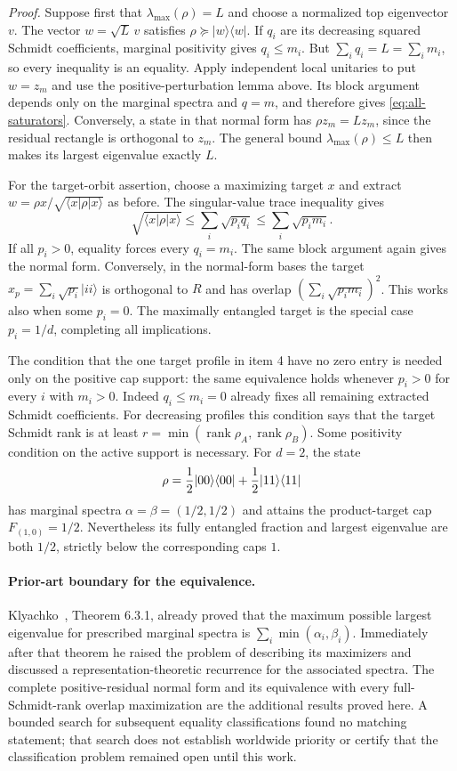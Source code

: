 \emph{Proof.} Suppose first that $\lambda_{\max}(\rho)=L$ and choose a
normalized top eigenvector $v$. The vector $w=\sqrt L\,v$ satisfies
$\rho\succeq|w\rangle\langle w|$. If $q_i$ are its decreasing squared
Schmidt coefficients, marginal positivity gives $q_i\le m_i$. But
$\sum_i q_i=L=\sum_i m_i$, so every inequality is an equality. Apply
independent local unitaries to put $w=z_m$ and use the positive-perturbation
lemma above. Its block argument depends only on the marginal spectra and
$q=m$, and therefore gives \eqref{eq:all-saturators}. Conversely, a state
in that normal form has $\rho z_m=Lz_m$, since the residual rectangle is
orthogonal to $z_m$. The general bound $\lambda_{\max}(\rho)\le L$
then makes its largest eigenvalue exactly $L$.

For the target-orbit assertion, choose a maximizing target $x$ and extract
$w=\rho x/\sqrt{\langle x|\rho|x\rangle}$ as before. The singular-value
trace inequality gives
\[
 \sqrt{\langle x|\rho|x\rangle}
 \le\sum_i\sqrt{p_i q_i}\le\sum_i\sqrt{p_i m_i}.
\]
If all $p_i>0$, equality forces every $q_i=m_i$. The same block argument
again gives the normal form. Conversely, in the normal-form bases the
target $x_p=\sum_i\sqrt{p_i}|ii\rangle$ is orthogonal to $R$ and has
overlap $(\sum_i\sqrt{p_i m_i})^2$. This works also when some $p_i=0$.
The maximally entangled target is the special case $p_i=1/d$, completing
all implications.

The condition that the one target profile in item 4 have no zero entry is
needed only on the positive cap support: the same equivalence holds whenever
$p_i>0$ for every $i$ with $m_i>0$. Indeed $q_i\le m_i=0$ already fixes
all remaining extracted Schmidt coefficients. For decreasing profiles this
condition says that the target Schmidt rank is at least
$r=\min(\operatorname{rank}\rho_A,\operatorname{rank}\rho_B)$.
Some positivity condition on the active support is necessary. For $d=2$, the state
\[
 \rho={1\over2}|00\rangle\langle00|
       +{1\over2}|11\rangle\langle11|
\]
has marginal spectra $\alpha=\beta=(1/2,1/2)$ and attains the product-target
cap $F_{(1,0)}=1/2$. Nevertheless its fully entangled fraction and largest
eigenvalue are both $1/2$, strictly below the corresponding caps $1$.

\paragraph{Prior-art boundary for the equivalence.}
Klyachko~\cite{klyachko}, Theorem 6.3.1, already proved that the
maximum possible largest eigenvalue for prescribed marginal spectra is
$\sum_i\min(\alpha_i,\beta_i)$. Immediately after that theorem he raised
the problem of describing its maximizers and discussed a representation-theoretic
recurrence for the associated spectra. The complete positive-residual
normal form and its equivalence with every full-Schmidt-rank overlap
maximization are the additional results proved here. A bounded search for
subsequent equality classifications found no matching statement; that search
does not establish worldwide priority or certify that the classification
problem remained open until this work.


